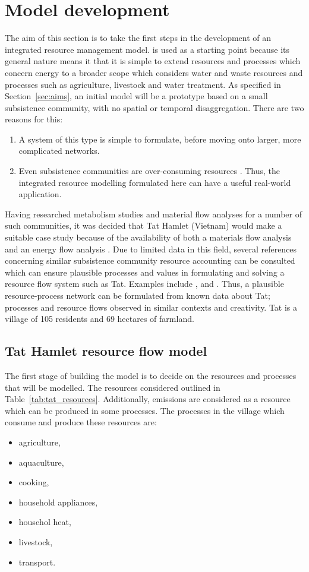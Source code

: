 \section{Model development} \label{sec:models}
The aim of this section is to take the first steps in the development of an integrated resource management model. \citet{Samsatli} is used as a starting point because its general nature means it that it is simple to extend resources and processes which concern energy to a broader scope which considers water and waste resources and processes such as agriculture, livestock and water treatment. As specified in Section~\ref{sec:aims}, an initial model will be a prototype based on a small subsistence community, with no spatial or temporal disaggregation. There are two reasons for this: 
\begin{enumerate}
	\item A system of this type is simple to formulate, before moving onto larger, more complicated networks.
	\item Even subsistence communities are over-consuming resources \citep{Hobbes2005, Hobbes2007, Shandl2006, Haberl2002}. Thus, the integrated resource modelling formulated here can have a useful real-world application.
\end{enumerate}

Having researched metabolism studies and material flow analyses for a number of such communities, it was decided that Tat Hamlet (Vietnam) would make a suitable case study because of the availability of both a materials flow analysis \citep{Hobbes2007, Shandl2006} and an energy flow analysis \citep{Heezen2003}. Due to limited data in this field, several references concerning similar subsistence community resource accounting can be consulted which can ensure plausible processes and values in formulating and solving a resource flow system such as Tat. Examples include \citet{Alam1997}, \citet{Alam1999} and \citep{Tripathi2001}. Thus, a plausible resource-process network can be formulated from known data about Tat; processes and resource flows observed in similar contexts and creativity. Tat is a village of 105 residents and 69 hectares of farmland.

\subsection{Tat Hamlet resource flow model}
The first stage of building the model is to decide on the resources and processes that will be modelled. The resources considered outlined in Table~\ref{tab:tat_resources}. Additionally, emissions are considered as a resource which can be produced in some processes. The processes in the village which consume and produce these resources are:
\begin{itemize}
	\item agriculture,
	\item aquaculture,
	\item cooking,
	\item household appliances,
	\item househol heat,
	\item livestock,
	\item transport.
\end{itemize}

